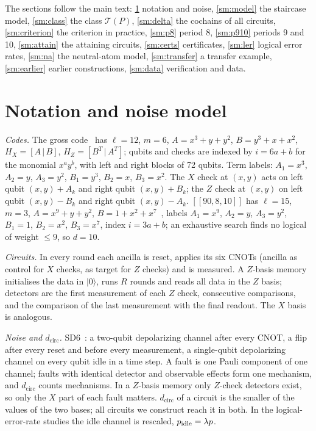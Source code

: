 \documentclass[aps,prl,twocolumn,superscriptaddress,nofootinbib]{revtex4-2}
\newcommand{\dcirc}{d_{\mathrm{circ}}}
\newcommand{\code}[1]{[[#1]]}
\newcommand{\T}{\mathcal{T}}
\begin{document}
The sections follow the main text: \ref{sm:notation} notation and noise,
\ref{sm:model} the staircase model, \ref{sm:class} the class $\T(P)$, \ref{sm:delta} the
cochains of all circuits, \ref{sm:criterion} the criterion in practice, \ref{sm:p8} period
8, \ref{sm:p910} periods 9 and 10, \ref{sm:attain} the attaining circuits,
\ref{sm:certs} certificates, \ref{sm:ler} logical error rates, \ref{sm:na} the
neutral-atom model, \ref{sm:transfer} a transfer example, \ref{sm:earlier} earlier
constructions, \ref{sm:data} verification and data.

\section{Notation and noise model}\label{sm:notation}
\emph{Codes.} The gross code~\cite{Bravyi2024} has $\ell=12$, $m=6$, $A=x^3+y+y^2$,
$B=y^3+x+x^2$, $H_X=[A\,|\,B]$, $H_Z=[B^{T}\,|\,A^{T}]$; qubits and checks are indexed by
$i=6a+b$ for the monomial $x^ay^b$, with left and right blocks of 72 qubits. Term labels:
$A_1=x^3$, $A_2=y$, $A_3=y^2$, $B_1=y^3$, $B_2=x$, $B_3=x^2$. The $X$ check at $(x,y)$ acts
on left qubit $(x,y)+A_k$ and right qubit $(x,y)+B_k$; the $Z$ check at $(x,y)$ on left
qubit $(x,y)-B_k$ and right qubit $(x,y)-A_k$. $\code{90,8,10}$ has $\ell=15$, $m=3$,
$A=x^9+y+y^2$, $B=1+x^2+x^7$~\cite{Bravyi2024}, labels $A_1=x^9$, $A_2=y$, $A_3=y^2$,
$B_1=1$, $B_2=x^2$, $B_3=x^7$, index $i=3a+b$; an exhaustive search finds no logical of
weight $\le9$, so $d=10$.

\emph{Circuits.} In every round each ancilla is reset, applies its six CNOTs (ancilla as
control for $X$ checks, as target for $Z$ checks) and is measured. A $Z$-basis memory
initialises the data in $|0\rangle$, runs $R$ rounds and reads all data in the $Z$ basis;
detectors are the first measurement of each $Z$ check, consecutive comparisons, and the
comparison of the last measurement with the final readout. The $X$ basis is analogous.

\emph{Noise and $\dcirc$.} SD6~\cite{Gidney2021honeycomb}: a two-qubit depolarizing channel
after every CNOT, a flip after every reset and before every measurement, a single-qubit
depolarizing channel on every qubit idle in a time step. A fault is one Pauli component of
one channel; faults with identical detector and observable effects form one mechanism, and
$\dcirc$ counts mechanisms. In a $Z$-basis memory only $Z$-check detectors exist, so only
the $X$ part of each fault matters. $\dcirc$ of a circuit is the smaller of the values of
the two bases; all circuits we construct reach it in both. In the logical-error-rate
studies the idle channel is rescaled, $p_{\rm idle}=\lambda p$.
\end{document}
